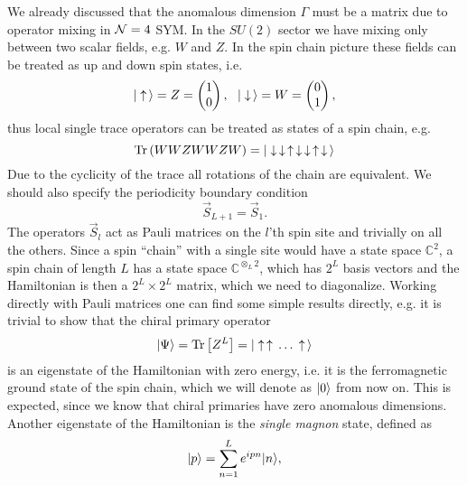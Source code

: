 We already discussed that the anomalous dimension $\Gamma$ must be a matrix due to operator mixing in $\mathcal{N}=4$ SYM. In the $SU(2)$ sector we have mixing only between two scalar fields, e.g. $W$ and $Z$. In the spin chain picture these fields can be treated as up and down spin states, i.e.
\begin{equation}
	|\uparrow\,\rangle = Z = \left( \begin{matrix} 1 \\ 0 \end{matrix} \right), \,\,\,\, |\downarrow\,\rangle = W = \left( \begin{matrix} 0 \\ 1 \end{matrix} \right),
\end{equation}
thus local single trace operators can be treated as states of a spin chain, e.g.
\begin{equation}
	\mathrm{Tr} \left( WWZWWZW \right) = |\downarrow \, \downarrow \, \uparrow \, \downarrow \, \downarrow \, \uparrow \, \downarrow \,\rangle
\end{equation}
Due to the cyclicity of the trace all rotations of the chain are equivalent. We should also specify the periodicity boundary condition
\begin{equation}
	\vec{S}_{L+1} = \vec{S}_1.
\end{equation}
The operators $\vec{S}_l$ act as Pauli matrices on the $l$'th spin site and trivially on all the others. Since a spin ``chain'' with a single site would have a state space $\mathbb{C}^2$, a spin chain of length $L$ has a state space $\mathbb{C}^{\otimes_L 2}$, which has $2^L$ basis vectors and the Hamiltonian is then a $2^L \times 2^L$ matrix, which we need to diagonalize. Working directly with Pauli matrices one can find some simple results directly, e.g. it is trivial to show that the chiral primary operator
\begin{equation}
	|\Psi\rangle = \mathrm{Tr} \left[ Z^L \right] = |\uparrow \, \uparrow \, \dots \, \uparrow \,\rangle
\end{equation}
is an eigenstate of the Hamiltonian with zero energy, i.e. it is the ferromagnetic ground state of the spin chain, which we will denote as $|0\rangle$ from now on. This is expected, since we know that chiral primaries have zero anomalous dimensions. Another eigenstate of the Hamiltonian is the \emph{single magnon} state, defined as
\begin{equation}
	|p\rangle = \sum_{n=1}^L e^{ipn} |n\rangle,
\end{equation} 
